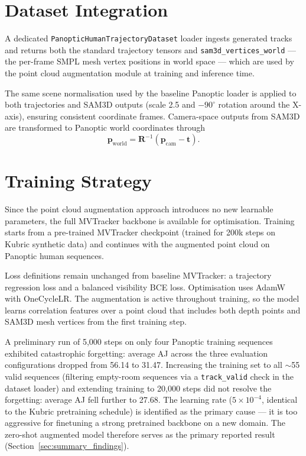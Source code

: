 \documentclass[12pt, a4paper, oneside]{report}
\begin{document}
\section{Dataset Integration}
A dedicated \texttt{PanopticHumanTrajectoryDataset} loader ingests generated tracks and returns both the standard trajectory tensors and \texttt{sam3d\_vertices\_world} --- the per-frame SMPL mesh vertex positions in world space --- which are used by the point cloud augmentation module at training and inference time.

The same scene normalisation used by the baseline Panoptic loader is applied to both trajectories and SAM3D outputs (scale 2.5 and $-90^{\circ}$ rotation around the X-axis), ensuring consistent coordinate frames. Camera-space outputs from SAM3D are transformed to Panoptic world coordinates through
\begin{equation}
    \mathbf{p}_{\text{world}} = \mathbf{R}^{-1} (\mathbf{p}_{\text{cam}} - \mathbf{t}).
\end{equation}

\section{Training Strategy}
Since the point cloud augmentation approach introduces no new learnable parameters, the full MVTracker backbone is available for optimisation. Training starts from a pre-trained MVTracker checkpoint (trained for 200k steps on Kubric synthetic data) and continues with the augmented point cloud on Panoptic human sequences.

Loss definitions remain unchanged from baseline MVTracker: a trajectory regression loss and a balanced visibility BCE loss. Optimisation uses AdamW with OneCycleLR. The augmentation is active throughout training, so the model learns correlation features over a point cloud that includes both depth points and SAM3D mesh vertices from the first training step.

A preliminary run of 5,000 steps on only four Panoptic training sequences exhibited catastrophic forgetting: average AJ across the three evaluation configurations dropped from 56.14 to 31.47. Increasing the training set to all $\sim$55 valid sequences (filtering empty-room sequences via a \texttt{track\_valid} check in the dataset loader) and extending training to 20,000 steps did not resolve the forgetting: average AJ fell further to 27.68. The learning rate ($5 \times 10^{-4}$, identical to the Kubric pretraining schedule) is identified as the primary cause --- it is too aggressive for finetuning a strong pretrained backbone on a new domain. The zero-shot augmented model therefore serves as the primary reported result (Section~\ref{sec:summary_findings}).
\end{document}
